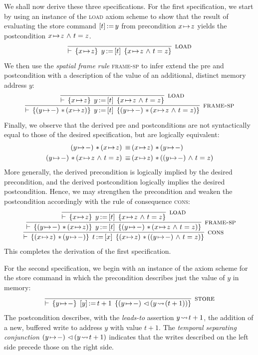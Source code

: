 \documentclass[11pt]{report}
\begin{document}
We shall now derive these three specifications. For the first specification, we start by using an instance of the \textsc{load} axiom scheme to show that the result of evaluating the store command $\left[ t \right] \operatorname{:\!=} y$ from precondition $x \!\mapsto\! z$ yields the postcondition $x \!\mapsto\! z \operatorname{\,\wedge\,} t = z$.
\[ 
  \infer[\textsc{load}]{\triple{x \fpointsto z}{\cload{y}{t}}{x \fpointsto z \conj t = z}}{}
\] We then use the \emph{spatial frame rule} \textsc{frame-sp} to infer extend the pre and postcondition with a description of the value of an additional, distinct memory address $y$: \[ 
  \infer[\textsc{frame-sp}]{\triple{(y \fpointsto -) \fsep (x \fpointsto z)}{\cload{y}{t}}{(y \fpointsto -) \fsep (x \fpointsto z \conj t = z)}}{
    \infer[\textsc{load}]{\triple{x \fpointsto z}{\cload{y}{t}}{x \fpointsto z \conj t = z}}{}
  }
\] Finally, we observe that the derived pre and postconditions are not syntactically equal to those of the desired specification, but are logically equivalent: \begin{align*}
(y \fpointsto -) \fsep (x \fpointsto z) \sequiv & (x \fpointsto z) \fsep (y \fpointsto -) \\ 
(y \fpointsto -) \fsep (x \fpointsto z \conj t = z) \sequiv & (x \fpointsto z) \fsep ((y \fpointsto -) \conj t = z)
\end{align*} More generally, the derived precondition is logically implied by the desired precondition, and the derived postcondition logically implies the desired postcondition. Hence, we may strengthen the precondition and weaken the postcondition accordingly with the rule of consequence \textsc{cons}: \[ 
  \infer[\textsc{cons}]{\triple{(x \fpointsto z) \fsep (y \fpointsto -)}{\cload{t}{x}}{(x \fpointsto z) \fsep ((y \fpointsto -) \conj t = z)}}{
    \infer[\textsc{frame-sp}]{\triple{(y \fpointsto -) \fsep (x \fpointsto z)}{\cload{y}{t}}{(y \fpointsto -) \fsep (x \fpointsto z \conj t = z)}}{
      \infer[\textsc{load}]{\triple{x \fpointsto z}{\cload{y}{t}}{x \fpointsto z \conj t = z}}{}
    }
  }
\] This completes the derivation of the first specification. 

For the second specification, we begin with an instance of the axiom scheme for the store command in which the precondition describes just the value of $y$ in memory: \[ \infer[\textsc{store}]{\triple{y \fpointsto -}{\cstore{y}{t+1}}{(y \fpointsto -) \fseq (y \fwriteu (t+1))}}{}\] The postcondition describes, with the \emph{leads-to} assertion $y \!\leadsto\!  t+1$, the addition of a new, buffered write to address $y$ with value $t+1$. The \emph{temporal separating conjunction} $(y \!\mapsto\! -) \operatorname{\,\vartriangleleft\,} (y \!\leadsto\! t+1)$ indicates that the writes described on the left side precede those on the right side. 
\end{document}
